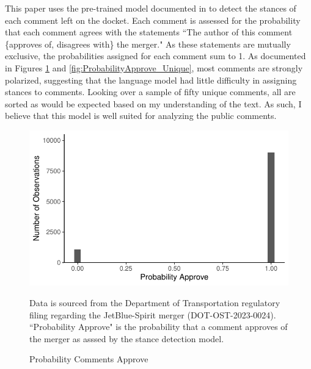 \documentclass{article}
\begin{document}
\begin{appendices}
This paper uses the pre-trained model documented in \citet{laurer_less_2024} to detect the stances of each comment left on the docket. Each comment is assessed for the probability that each comment agrees with the statements ``The author of this comment \{approves of, disagrees with\} the merger." As these statements are mutually exclusive, the probabilities assigned for each comment sum to 1. As documented in Figures \ref{fig:ProbabilityApprove} and \ref{fig:ProbabilityApprove_Unique}, most comments are strongly polarized, suggesting that the language model had little difficulty in assigning stances to comments. Looking over a sample of fifty unique comments, all are sorted as would be expected based on my understanding of the text. As such, I believe that this model is well suited for analyzing the public comments.  

	\begin{figure}
		\caption{Probability Comments Approve}
		\label{fig:ProbabilityApprove}
        \begin{center}
        \includegraphics{05.Figures/stance_strength_graph}
        \end{center}
		\begin{minipage}{\textwidth} 
			{\footnotesize Data is sourced from the Department of Transportation regulatory filing regarding the JetBlue-Spirit merger (DOT-OST-2023-0024). ``Probability Approve" is the probability that a comment approves of the merger as asssed by the stance detection model.} 
		\end{minipage}
	\end{figure}
	

\end{appendices}
\end{document}
